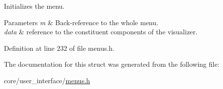 Initializes the menu. 


\begin{DoxyParams}{Parameters}
{\em m} & Back-\/reference to the whole menu. \\
\hline
{\em data} & reference to the constituent components of the visualizer. \\
\hline
\end{DoxyParams}


Definition at line 232 of file menus.\+h.



The documentation for this struct was generated from the following file\+:\begin{DoxyCompactItemize}
\item 
core/user\+\_\+interface/\hyperlink{menus_8h}{menus.\+h}\end{DoxyCompactItemize}
